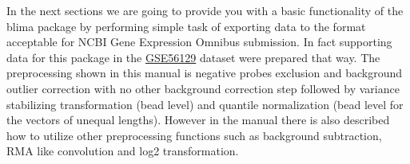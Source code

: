 In the next sections we are going to provide you with a basic functionality of the blima package by performing simple task of exporting data to the format acceptable for NCBI Gene Expression Omnibus submission. In fact supporting data for this package in the \href{http://www.ncbi.nlm.nih.gov/geo/query/acc.cgi?acc=GSE56129}{GSE56129} dataset were prepared that way. The preprocessing shown in this manual is negative probes exclusion and background outlier correction with no other background correction step followed by variance stabilizing transformation (bead level) and quantile normalization (bead level for the vectors of unequal lengths). However in the manual there is also described how to utilize other preprocessing functions such as background subtraction, RMA like convolution and log2 transformation.  